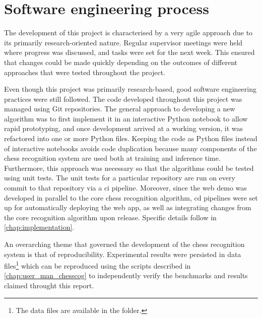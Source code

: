 \section{Software engineering process}
The development of this project is characterised by a very agile approach due to its primarily research-oriented nature.
Regular supervisor meetings were held where progress was discussed, and tasks were set for the next week.
This ensured that changes could be made quickly depending on the outcomes of different approaches that were tested throughout the project.

Even though this project was primarily research-based, good software engineering practices were still followed.
The code developed throughout this project was managed using Git repositories.
The general approach to developing a new algorithm was to first implement it in an interactive Python notebook to allow rapid prototyping, and once development arrived at a working version, it was refactored into one or more Python files.
Keeping the code as Python files instead of interactive notebooks avoids code duplication because many components of the chess recognition system are used both at training and inference time.
Furthermore, this approach was necessary so that the algorithms could be tested using unit tests.
The unit tests for a particular repository are run on every commit to that repository via a \gls{ci} pipeline.
Moreover, since the web demo was developed in parallel to the core chess recognition algorithm, \gls{cd} pipelines were set up for automatically deploying the web app, as well as integrating changes from the core recognition algorithm upon release.
Specific details follow in \cref{chap:implementation}.

An overarching theme that governed the development of the chess recognition system is that of reproducibility.
Experimental results were persisted in data files\footnote{The data files are available in the  folder.} which can be reproduced using the scripts described in \cref{chap:user_man_chesscog} to independently verify the benchmarks and results claimed throught this report.